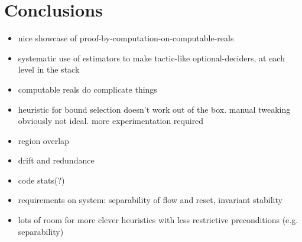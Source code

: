 \documentclass[runningheads]{llncs}
\begin{document}

\section{Conclusions}
\label{conclusions}

\begin{itemize}
\item nice showcase of proof-by-computation-on-computable-reals
\item systematic use of estimators to make tactic-like optional-deciders, at each level in the stack
\item computable reals do complicate things
\item heuristic for bound selection doesn't work out of the box. manual tweaking obviously not ideal. more experimentation required
\item region overlap
\item drift and redundance
\item code stats(?)
\item requirements on system: separability of flow and reset, invariant stability
\item lots of room for more clever heuristics with less restrictive preconditions (e.g. separability)
\end{itemize}



\end{document}
